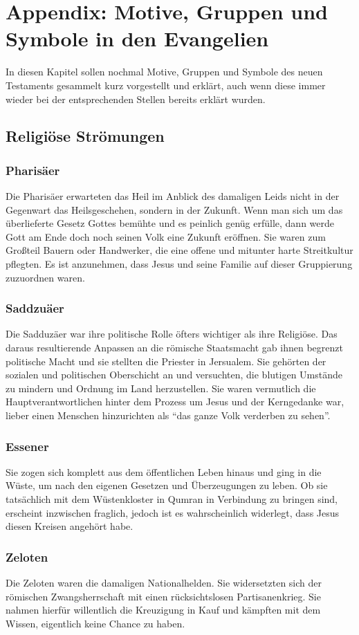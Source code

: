 \chapter{Appendix: Motive, Gruppen und Symbole in den Evangelien}
In diesen Kapitel sollen nochmal Motive, Gruppen und Symbole des neuen Testaments gesammelt kurz vorgestellt und erklärt, auch wenn diese immer wieder bei der entsprechenden Stellen bereits erklärt wurden.

\section{Religiöse Strömungen}
\subsection{Pharisäer}
Die Pharisäer erwarteten das Heil im Anblick des damaligen Leids nicht in der Gegenwart das Heilsgeschehen, sondern in der Zukunft. Wenn man sich um das überlieferte Gesetz Gottes bemühte und es peinlich genüg erfülle, dann werde Gott am Ende doch noch seinen Volk eine Zukunft eröffnen. Sie waren zum Großteil Bauern oder Handwerker, die eine offene und mitunter harte Streitkultur pflegten. Es ist anzunehmen, dass Jesus und seine Familie auf dieser Gruppierung zuzuordnen waren.

\subsection{Saddzuäer}
Die Sadduzäer war ihre politische Rolle öfters wichtiger als ihre Religiöse. Das daraus resultierende Anpassen an die römische Staatsmacht gab ihnen begrenzt politische Macht und sie stellten die Priester in Jersualem. Sie gehörten der sozialen und politischen Oberschicht an und versuchten, die blutigen Umstände zu mindern und Ordnung im Land herzustellen. Sie waren vermutlich die Hauptverantwortlichen hinter dem Prozess um Jesus und der Kerngedanke war, lieber einen Menschen hinzurichten als ``das ganze Volk verderben zu sehen''.

\subsection{Essener}
Sie zogen sich komplett aus dem öffentlichen Leben hinaus und ging in die Wüste, um nach den eigenen Gesetzen und Überzeugungen zu leben. Ob sie tatsächlich mit dem Wüstenkloster in Qumran in Verbindung zu bringen sind, erscheint inzwischen fraglich, jedoch ist es wahrscheinlich widerlegt, dass Jesus diesen Kreisen angehört habe.

\subsection{Zeloten}
Die Zeloten waren die damaligen Nationalhelden. Sie widersetzten sich der römischen Zwangsherrschaft mit einen rücksichtslosen Partisanenkrieg. Sie nahmen hierfür willentlich die Kreuzigung in Kauf und kämpften mit dem Wissen, eigentlich keine Chance zu haben.